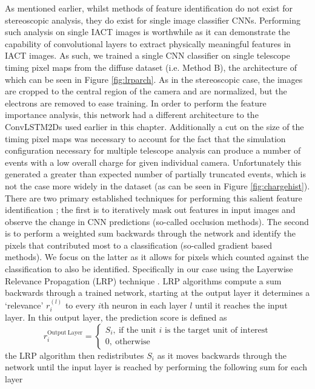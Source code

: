 As mentioned earlier, whilst methods of feature identification do not exist for stereoscopic analysis, they do exist for single image classifier CNNs. Performing such analysis on single IACT images is worthwhile as it can demonstrate the capability of convolutional layers to extract physically meaningful features in IACT images. As such, we trained a single CNN classifier on single telescope timing pixel maps from the diffuse dataset (i.e. Method B), the architecture of which can be seen in Figure \ref{fig:lrparch}. As in the stereoscopic case, the images are cropped to the central region of the camera and are normalized, but the electrons are removed to ease training. In order to perform the feature importance analysis, this network had a different architecture to the ConvLSTM2Ds used earlier in this chapter. Additionally a cut on the size of the timing pixel maps was necessary to account for the fact that the simulation configuration necessary for multiple telescope analysis can produce a number of events with a low overall charge for given individual camera. Unfortunately this generated a greater than expected number of partially truncated events, which is not the case more widely in the dataset (as can be seen in Figure \ref{fig:chargehist}). There are two primary established techniques for performing this salient feature identification \cite{deepexplain}; the first is to iteratively mask out features in input images and observe the change in CNN predictions (so-called occlusion methods). The second is to perform a weighted sum backwards through the network and identify the pixels that contributed most to a classification (so-called gradient based methods). We focus on the latter as it allows for pixels which counted against the classification to also be identified. Specifically in our case using the Layerwise Relevance Propagation (LRP) technique \cite{LRP}. LRP algorithms compute a sum backwards through a trained network, starting at the output layer it determines a `relevance' $r^{(l)}_i$ to every $i$th neuron in each layer $l$ until it reaches the input layer. In this output layer, the prediction score is defined as
\begin{equation}
    r_i^{\mathrm{Output\ Layer}}=
    \begin{cases}
    S_i,\  \textrm{if the unit $i$ is the target unit of interest}
    \\0,\ \textrm{otherwise}
    \end{cases}
\end{equation}
the LRP algorithm then redistributes $S_i$ as it moves backwards through the network until the input layer is reached by performing the following sum for each layer
